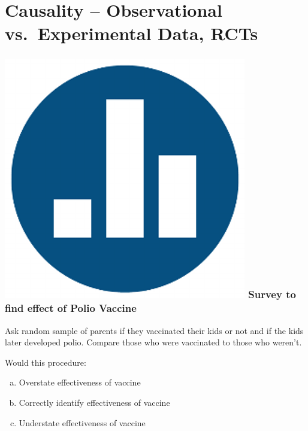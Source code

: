 \section{Causality -- Observational vs.\ Experimental Data, RCTs}
\begin{frame}
\frametitle{\includegraphics[scale = 0.05]{./images/clicker} \hfill Survey to find effect of Polio Vaccine}
Ask random sample of parents if they vaccinated their kids or not and if the kids later developed polio. Compare those who were vaccinated to those who weren't.

\vspace{1em}


Would this procedure:
	\begin{enumerate}[(a)]
		\item Overstate effectiveness of vaccine
		\item Correctly identify effectiveness of vaccine
		\item Understate effectiveness of vaccine
	\end{enumerate}

\end{frame}

